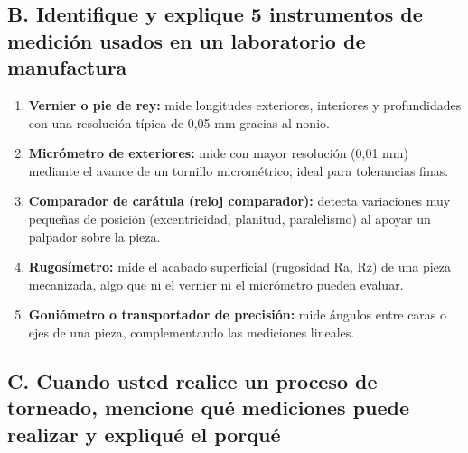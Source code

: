 \documentclass[12pt,a4paper]{article}
\begin{document}
\subsection*{B. Identifique y explique 5 instrumentos de medición usados en un
	laboratorio de manufactura}

\begin{enumerate}[label=\textbf{\arabic*.}]
	\item \textbf{Vernier o pie de rey:} mide longitudes exteriores, interiores y
	      profundidades con una resolución típica de 0,05 mm gracias al
	      nonio.\\[-10pt]
	\item \textbf{Micrómetro de exteriores:} mide con mayor resolución (0,01 mm)
	      mediante el avance de un tornillo micrométrico; ideal para tolerancias
	      finas.\\[-10pt]
	\item \textbf{Comparador de carátula (reloj comparador):} detecta variaciones
	      muy pequeñas de posición (excentricidad, planitud, paralelismo) al
	      apoyar un palpador sobre la pieza.\\[-10pt]
	\item \textbf{Rugosímetro:} mide el acabado superficial (rugosidad Ra, Rz) de
	      una pieza mecanizada, algo que ni el vernier ni el micrómetro pueden
	      evaluar.\\[-10pt]
	\item \textbf{Goniómetro o transportador de precisión:} mide ángulos entre
	      caras o ejes de una pieza, complementando las mediciones lineales.
\end{enumerate}

\subsection*{C. Cuando usted realice un proceso de torneado, mencione qué
	mediciones puede realizar y expliqué el porqué}
\end{document}
